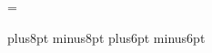\newdimen\@mwdtmp
\def\@mwd#1#2#3{\fordef\@=#3\do{\setbox\@box=\hbox{\@}%
	\ifdim\wd\@box#2\@mwdtmp \global\@mwdtmp=\wd\@box \fi}#1=\@mwdtmp}
\def\maxwd#1={\@mwdtmp=-\maxdimen \@mwd{#1}>}
\def\minwd#1={\@mwdtmp=\maxdimen \@mwd{#1}<}

\newcount{} {}
\def\@defer#1#2{%
	\ea#1\csname$defer\the\defercnt\endcsname{#2}%
	\ea\aftergroup\csname$defer\the\defercnt\endcsname
	\advance\defercnt1 }
\def\defer{\@defer\gdef}
\def\edefer{\@defer\xdef}

\def\savethe#1{\ea\defer\ea{\ea#1\the#1}}

\def\saveif#1{%
	\def\@saveiftrue{\defer{\let#1=\iftrue}}%
	\def\@saveiffalse{\defer{\let#1=\iffalse}}%
	#1\@saveiftrue\else\@saveiffalse\fi}

\def\ascend#1={\def\@ascend{\savethe{#1}}\afterassignment\@ascend#1=}




\parindent=0pt
\parskip=\smallskipamount

\newskip\hugeskipamount \hugeskipamount=24pt plus8pt minus8pt
\newdimen\prob@sidesize \prob@sidesize=20pt
\newdimen\prob@rulegap  \prob@rulegap=5pt
\newskip\prob@topskip   \prob@topskip=16pt plus6pt minus6pt

\newcount\@count   \newcount\@@count
\newskip\@skip     \newskip\@@skip
\newmuskip\@muskip \newmuskip\@@muskip
\newdimen\@dimen   \newdimen\@@dimen
\newbox\@box       \newbox\@@box



